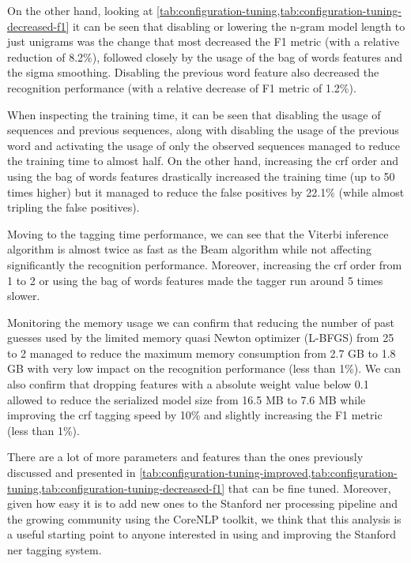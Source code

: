 On the other hand, looking at \cref{tab:configuration-tuning,tab:configuration-tuning-decreased-f1} it can be seen that disabling or lowering the n-gram model length to just unigrams was the change that most decreased the F1 metric (with a relative reduction of 8.2\%), followed closely by the usage of the bag of words features and the sigma smoothing. Disabling the previous word feature also decreased the recognition performance (with a relative decrease of F1 metric of 1.2\%).

When inspecting the training time, it can be seen that disabling the usage of sequences and previous sequences, along with disabling the usage of the previous word and activating the usage of only the observed sequences managed to reduce the training time to almost half. On the other hand, increasing the \gls{crf} order and using the bag of words features drastically increased the training time (up to 50 times higher) but it managed to reduce the false positives by 22.1\% (while almost tripling the false positives).

Moving to the tagging time performance, we can see that the Viterbi inference algorithm is almost twice as fast as the Beam algorithm while not affecting significantly the recognition performance. Moreover, increasing the \gls{crf} order from 1 to 2 or using the bag of words features made the tagger run around 5 times slower.

Monitoring the memory usage we can confirm that reducing the number of past guesses used by the limited memory quasi Newton optimizer (L-BFGS) from 25 to 2 managed to reduce the maximum memory consumption from 2.7 GB to 1.8 GB with very low impact on the recognition performance (less than 1\%). We can also confirm that dropping features with a absolute weight value below 0.1 allowed to reduce the serialized model size from 16.5 MB to 7.6 MB while improving the \gls{crf} tagging speed by 10\% and slightly increasing the F1 metric (less than 1\%).

There are a lot of more parameters and features than the ones previously discussed and presented in \cref{tab:configuration-tuning-improved,tab:configuration-tuning,tab:configuration-tuning-decreased-f1} that can be fine tuned. Moreover, given how easy it is to add new ones to the Stanford \gls{ner} processing pipeline and the growing community using the CoreNLP toolkit, we think that this analysis is a useful starting point to anyone interested in using and improving the Stanford \gls{ner} tagging system.


